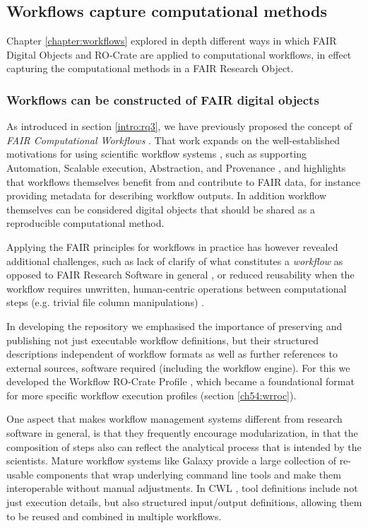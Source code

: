 \subsection{Workflows capture computational methods}
\label{ch61:workflow}

Chapter \vref{chapter:workflows} explored in depth different ways in which FAIR Digital Objects and RO-Crate are applied to computational workflows, in effect capturing the computational methods in a FAIR Research Object. 


\subsubsection{Workflows can be constructed of FAIR digital objects}
\label{ch61:workflowfdo}

As introduced in section \vref{intro:rq3}, we have previously proposed the concept of \emph{FAIR Computational Workflows} \cite{Goble 2020}. 
That work expands on the well-established motivations for using scientific workflow systems \cite{Möller 2017,Atkinson 2017}, such as supporting Automation, Scalable execution, Abstraction, and Provenance \cite{Ludäscher 2016}, and highlights that workflows themselves benefit from and contribute to FAIR data, for instance providing metadata for describing workflow outputs. 
In addition workflow themselves can be considered digital objects that should be shared as a reproducible computational method.

Applying the FAIR principles for workflows in practice has however revealed additional challenges, such as lack of clarify of what constitutes a \emph{workflow} as opposed to FAIR Research Software in general \cite{Katz 2021b}, or reduced reusability when the workflow requires unwritten, human-centric operations between computational steps (e.g. trivial file column manipulations) \cite{Wilkinson 2022b}. 

In developing the repository  \cite{Goble 2021} we emphasised the importance of preserving and publishing not just executable workflow definitions, 
but their structured descriptions independent of workflow formats as well as further references to external sources, software required (including the workflow engine).
For this we developed the Workflow RO-Crate Profile \cite{Bacall 2022}, which became a foundational format for more specific workflow execution profiles (section \vref{ch54:wrroc}).

One aspect that makes workflow management systems different from research software in general, is that they frequently encourage modularization, in that the composition of steps also can reflect the analytical process that is intended by the scientists.
Mature workflow systems like Galaxy \cite{Galaxy 2022} provide a large collection of re-usable components that wrap underlying command line tools and make them interoperable without manual adjustments. 
In CWL  \cite{Crusoe 2022}, tool definitions include not just execution details, but also structured input/output definitions, allowing them to be reused and combined in multiple workflows.


